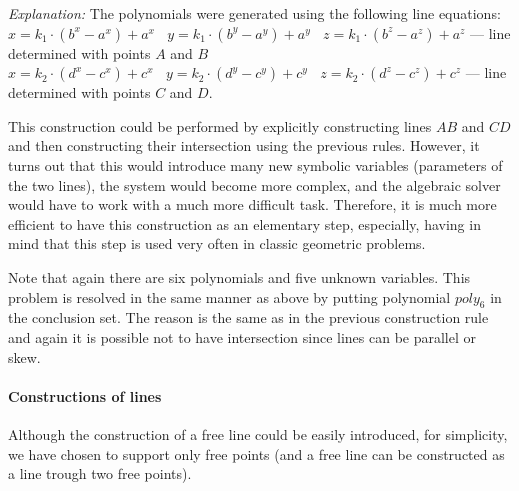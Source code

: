 \documentclass{aicom2e}
\begin{document}
\begin{description}
{\em Explanation:} The polynomials were generated using the following
line equations: \\ $x = k_1\cdot (b^x - a^x) + a^x \ \ \ \ y =
k_1\cdot (b^y - a^y) + a^y \ \ \ \ z = k_1\cdot (b^z - a^z) + a^z$ ---
line determined with points $A$ and $B$ \\ $x = k_2\cdot (d^x - c^x) +
c^x \ \ \ \ y = k_2\cdot (d^y - c^y) + c^y \ \ \ \ z = k_2\cdot (d^z -
c^z) + c^z$ --- line determined with points $C$ and $D$.



This construction could be performed by explicitly constructing lines
$AB$ and $CD$ and then constructing their intersection using the
previous rules. However, it turns out that this would introduce many
new symbolic variables (parameters of the two lines), the system would
become more complex, and the algebraic solver would have to work with
a much more difficult task. Therefore, it is much more efficient to
have this construction as an elementary step, especially, having in
mind that this step is used very often in classic geometric problems. 

Note that again there are six polynomials and five unknown
variables. This problem is resolved in the same manner as above by
putting polynomial $poly_6$ in the conclusion set. The reason is the
same as in the previous construction rule and again it is possible not
to have intersection since lines can be parallel or skew.
\end{description}


\paragraph{Constructions of lines}
Although the construction of a free line could be easily introduced,
for simplicity, we have chosen to support only free points (and a free
line can be constructed as a line trough two free points).
\end{document}
